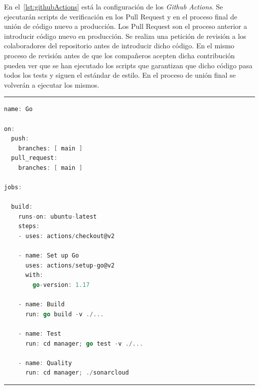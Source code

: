 En el~\cref{lst:githubActions} está la configuración de los \textit{Github Actions}.
Se ejecutarán scripts de verificación en los Pull Request y en el proceso final de unión de código nuevo a producción.
Los Pull Request son el proceso anterior a introducir código nuevo en producción.
Se realiza una petición de revisión a los colaboradores del repositorio antes de introducir dicho código.
En el mismo proceso de revisión antes de que los compañeros acepten dicha contribución pueden ver que se han ejecutado los scripts que garantizan que dicho código pasa todos los tests y siguen el estándar de estilo.
En el proceso de unión final se volverán a ejecutar los mismos.

\phantom{blank}
\vspace{10mm}
\hrule

\begin{lstlisting}[language=go,caption={githubActions.yml},breaklines=true,label={lst:githubActions}]
name: Go

on:
  push:
    branches: [ main ]
  pull_request:
    branches: [ main ]

jobs:

  build:
    runs-on: ubuntu-latest
    steps:
    - uses: actions/checkout@v2

    - name: Set up Go
      uses: actions/setup-go@v2
      with:
        go-version: 1.17

    - name: Build
      run: go build -v ./...

    - name: Test
      run: cd manager; go test -v ./...

    - name: Quality
      run: cd manager; ./sonarcloud
\end{lstlisting}

\hrule
